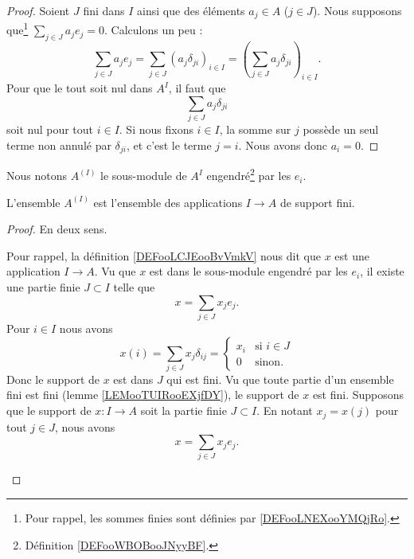 \begin{proof}
	Soient \( J\) fini dans \( I\) ainsi que des éléments \( a_j\in A\) (\( j\in J\)). Nous supposons que\footnote{Pour rappel, les sommes finies sont définies par \ref{DEFooLNEXooYMQjRo}.} \( \sum_{j\in J}a_je_j=0\). Calculons un peu :
	\begin{equation}
		\sum_{j\in J}a_je_j=\sum_{j\in J}(a_j\delta_{ji})_{i\in I}=\left( \sum_{j\in J}a_j\delta_{ji} \right)_{i\in I}.
	\end{equation}
	Pour que le tout soit nul dans \( A^I\), il faut que
	\begin{equation}
		\sum_{j\in J}a_j\delta_{ji}
	\end{equation}
	soit nul pour tout \( i\in I\). Si nous fixons \( i\in I\), la somme sur \( j\) possède un seul terme non annulé par \( \delta_{ji}\), et c'est le terme \( j=i\). Nous avons donc \( a_i=0\).
\end{proof}

\begin{definition}      \label{DEFooBMEPooFsCHgb}
	Nous notons \( A^{(I)}\) le sous-module de \( A^I\) engendré\footnote{Définition \ref{DEFooWBOBooJNyyBF}.} par les \( e_i\).
\end{definition}

\begin{lemma}
	L'ensemble \( A^{(I)}\) est l'ensemble des applications \( I\to A\) de support fini.
\end{lemma}

\begin{proof}
	En deux sens.
	\begin{subproof}
		\spitem[Si \( x\in A^{(I)}\)]
		Pour rappel, la définition \ref{DEFooLCJEooBvVmkV} nous dit que \( x\) est une application \( I\to A\). Vu que \( x\) est dans le sous-module engendré par les \( e_i\), il existe une partie finie \( J\subset I\) telle que
		\begin{equation}
			x=\sum_{j\in J}x_je_j.
		\end{equation}
		Pour \( i\in I\) nous avons
		\begin{equation}
			x(i)=\sum_{j\in J}x_j\delta_{ij}=\begin{cases}
				x_i & \text{si } i\in J \\
				0   & \text{sinon. }
			\end{cases}
		\end{equation}
		Donc le support de \( x\) est dans \( J\) qui est fini. Vu que toute partie d'un ensemble fini est fini (lemme \ref{LEMooTUIRooEXjfDY}), le support de \( x\) est fini.
		Supposons que le support de \( x\colon I\to A\) soit la partie finie \( J\subset I\). En notant \( x_j=x(j)\) pour tout \( j\in J\), nous avons
		\begin{equation}
			x=\sum_{j\in J}x_je_j.
		\end{equation}
	\end{subproof}
\end{proof}

